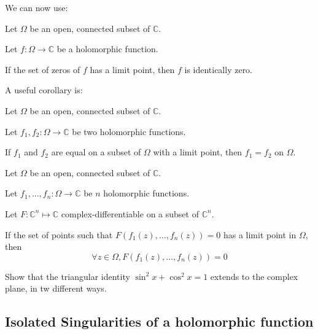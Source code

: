 We can now use:

\begin{thm*}
    Let $\Omega$ be an open, connected subset of $\mathbb{C}$.

    Let $f: \Omega \rightarrow \mathbb{C}$ be a holomorphic function.
    
    If the set of zeros of $f$ has a limit point, then $f$ is identically zero.
\end{thm*}

A useful corollary is:

\begin{thm*}
    Let $\Omega$ be an open, connected subset of $\mathbb{C}$.

    Let $f_1, f_2: \Omega \rightarrow \mathbb{C}$ be two holomorphic functions.

    If $f_1$ and $f_2$ are equal on a subset of $\Omega$ with a limit point, then $f_1=f_2$ on $\Omega$.
\end{thm*}

\begin{thm*}
    Let $\Omega$ be an open, connected subset of $\mathbb{C}$.

    Let $f_1, \dots, f_n: \Omega \rightarrow \mathbb{C}$ be $n$ holomorphic functions.

    Let $F : \mathbb{C}^n \mapsto \mathbb{C}$ complex-differentiable on a subset of $\mathbb{C}^n$.

    If the set of points such that $F(f_1(z), \dots, f_n(z)) = 0$ has a limit point in $\Omega$, then $$\forall z\in\Omega, F(f_1(z), \dots, f_n(z))=0$$
\end{thm*}

\begin{exo}
    [$\star$]
    Show that the triangular identity $\sin^2 x + \cos^2 x = 1$ extends to the complex plane, in tw different ways.
\end{exo}

\subsection{Isolated Singularities of a holomorphic function}


